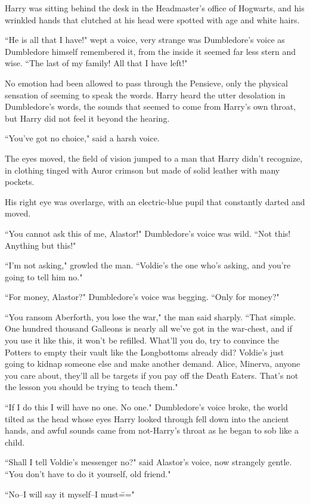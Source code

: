 \begin{em}
Harry was sitting behind the desk in the Headmaster's office of Hogwarts, and his wrinkled hands that clutched at his head were spotted with age and white hairs.

``He is all that I have!" wept a voice, very strange was Dumbledore's voice as Dumbledore himself remembered it, from the inside it seemed far less stern and wise. ``The last of my family! All that I have left!"

No emotion had been allowed to pass through the Pensieve, only the physical sensation of seeming to speak the words. Harry heard the utter desolation in Dumbledore's words, the sounds that seemed to come from Harry's own throat, but Harry did not feel it beyond the hearing.

``You've got no choice," said a harsh voice.

The eyes moved, the field of vision jumped to a man that Harry didn't recognize, in clothing tinged with Auror crimson but made of solid leather with many pockets.

His right eye was overlarge, with an electric-blue pupil that constantly darted and moved.

``You cannot ask this of me, Alastor!" Dumbledore's voice was wild. ``Not this! Anything but this!"

``I'm not asking," growled the man. ``Voldie's the one who's asking, and you're going to tell him no."

``For money, Alastor?" Dumbledore's voice was begging. ``Only for money?"

``You ransom Aberforth, you lose the war," the man said sharply. ``That simple. One hundred thousand Galleons is nearly all we've got in the war-chest, and if you use it like this, it won't be refilled. What'll you do, try to convince the Potters to empty their vault like the Longbottoms already did? Voldie's just going to kidnap someone else and make another demand. Alice, Minerva, anyone you care about, they'll all be targets if you pay off the Death Eaters. That's not the lesson you should be trying to teach them."

``If I do this I will have no one. No one." Dumbledore's voice broke, the world tilted as the head whose eyes Harry looked through fell down into the ancient hands, and awful sounds came from not-Harry's throat as he began to sob like a child.

``Shall I tell Voldie's messenger no?" said Alastor's voice, now strangely gentle. ``You don't have to do it yourself, old friend."

``No\---I will say it myself\---I must\==="
\end{em}

